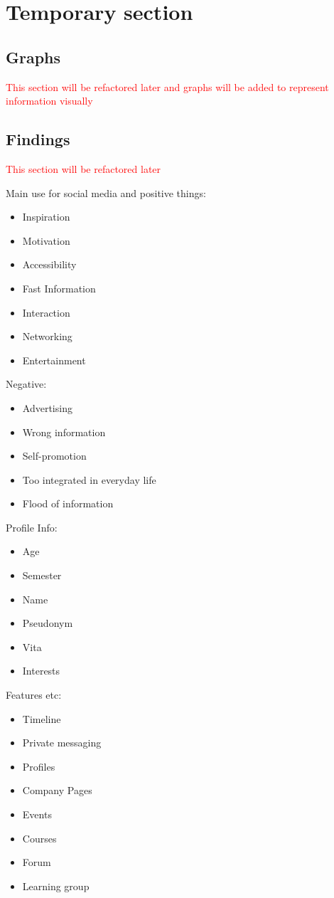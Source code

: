 \section{Temporary section}
\subsection{Graphs}

\textcolor{red}{This section will be refactored later and graphs will be added to represent information visually}

\subsection{Findings}
\textcolor{red}{This section will be refactored later}

Main use for social media and positive things:
\begin{itemize}
    \item Inspiration
    \item Motivation
    \item Accessibility
    \item Fast Information
    \item Interaction
    \item Networking
    \item Entertainment
\end{itemize}

Negative:
\begin{itemize}
    \item Advertising
    \item Wrong information
    \item Self-promotion
    \item Too integrated in everyday life
    \item Flood of information
\end{itemize}

Profile Info:
\begin{itemize}
    \item Age
    \item Semester
    \item Name
    \item Pseudonym
    \item Vita
    \item Interests
\end{itemize}

Features etc:
\begin{itemize}
    \item Timeline
    \item Private messaging
    \item Profiles
    \item Company Pages
    \item Events
    \item Courses
    \item Forum
    \item Learning group
\end{itemize}
